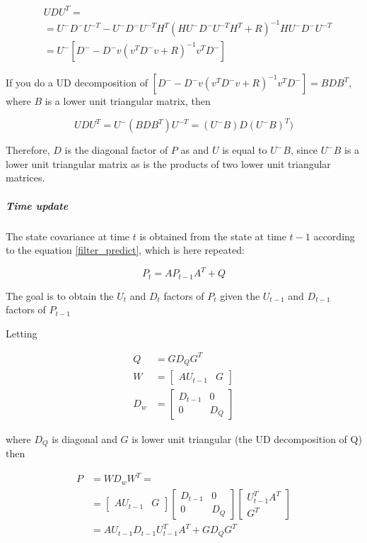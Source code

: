 \documentclass{article}
\begin{document}
\begin{align}
    &UDU^T = \\
    &= U^-D^-U^{-T} - U^-D^-U^{-T}H^T\left(HU^-D^-U^{-T}H^T + R\right)^{-1}HU^-D^-U^{-T} \\
    &= U^-\left[D^- - D^-v(v^TD^-v+R)^{-1}v^TD^- \right]
\end{align}

If you do a UD decomposition of $\left[D^- - D^-v(v^TD^-v+R)^{-1}v^TD^- \right] = BDB^T$, where $B$ is a lower unit triangular matrix, then 

\[ UDU^T = U^-(BDB^T)U^{-T} = (U^-B)D(U^-B)^{T}) \]

Therefore, $D$ is the diagonal factor of $P$ as and $U$ is equal to $U^-B$, since $U^-B$ is a lower unit triangular matrix as is the products of two lower unit triangular matrices.

\subparagraph{Time update}

The state covariance at time $t$ is obtained from the state at time $t-1$ according to the equation \ref{filter_predict}, which is here repeated:

$$ P_t = AP_{t-1}A^T + Q$$

The goal is to obtain the $U_t$ and $D_t$ factors of $P_t$ given the $U_{t-1}$ and $D_{t-1}$ factors of $P_{t-1}$

Letting

\begin{align}
    Q &= GD_QG^T\\
    W &= \begin{bmatrix}AU_{t-1}&G\end{bmatrix}\\
    D_w &= \begin{bmatrix}D_{t-1} & 0 \\ 0& D_Q \end{bmatrix}
\end{align}

where $D_Q$ is diagonal and $G$ is lower unit triangular (the UD decomposition of Q) then

\begin{equation}
\begin{split}
   P &= WD_wW^T = \\
&=\begin{bmatrix}AU_{t-1}&G\end{bmatrix}\begin{bmatrix}D_{t-1} & 0 \\ 0& D_Q \end{bmatrix}\begin{bmatrix}U^T_{t-1}A^T\\G^T\end{bmatrix} \\
&= AU_{t-1}D_{t-1}U^T_{t-1}A^T + GD_QG^T  
\end{split}
\end{equation}
\end{document}
